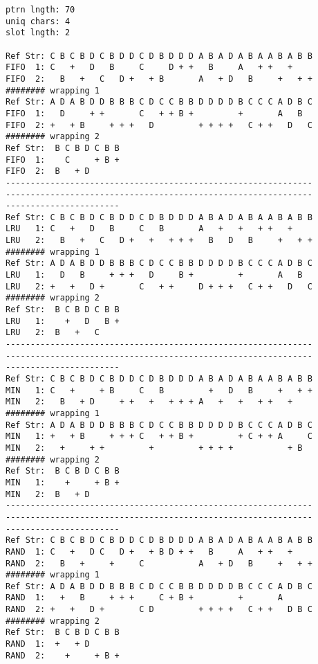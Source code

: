 \documentclass[11pt]{article}
\begin{document}
\begin{lstlisting}
ptrn lngth: 70
uniq chars: 4
slot lngth: 2

Ref Str: C B C B D C B D D C D B D D D A B A D A B A A B A B B
FIFO  1: C   +   D   B     C     D + +   B     A   + +   +
FIFO  2:   B   +   C   D +   + B       A   + D   B     +   + +
######## wrapping 1
Ref Str: A D A B D D B B B C D C C B B D D D D B C C C A D B C
FIFO  1:   D     + +       C   + + B +         +       A   B
FIFO  2: +   + B     + + +   D         + + + +   C + +   D   C
######## wrapping 2
Ref Str:  B C B D C B B
FIFO  1:    C     + B +
FIFO  2:  B   + D
--------------------------------------------------------------
--------------------------------------------------------------
-----------------------
Ref Str: C B C B D C B D D C D B D D D A B A D A B A A B A B B
LRU   1: C   +   D   B     C   B       A   +   +   + +   +
LRU   2:   B   +   C   D +   +   + + +   B   D   B     +   + +
######## wrapping 1
Ref Str: A D A B D D B B B C D C C B B D D D D B C C C A D B C
LRU   1:   D   B     + + +   D     B +         +       A   B
LRU   2: +   +   D +       C   + +     D + + +   C + +   D   C
######## wrapping 2
Ref Str:  B C B D C B B
LRU   1:    +   D   B +
LRU   2:  B   +   C
--------------------------------------------------------------
--------------------------------------------------------------
-----------------------
Ref Str: C B C B D C B D D C D B D D D A B A D A B A A B A B B
MIN   1: C   +     + B     C   B         +   D   B     +   + +
MIN   2:   B   + D     + +   +   + + + A   +   +   + +   +
######## wrapping 1
Ref Str: A D A B D D B B B C D C C B B D D D D B C C C A D B C
MIN   1: +   + B     + + + C   + + B +         + C + + A     C
MIN   2:   +     + +         +         + + + +           + B
######## wrapping 2
Ref Str:  B C B D C B B
MIN   1:    +     + B +
MIN   2:  B   + D
--------------------------------------------------------------
--------------------------------------------------------------
-----------------------
Ref Str: C B C B D C B D D C D B D D D A B A D A B A A B A B B
RAND  1: C   +   D C   D +   + B D + +   B     A   + +   +
RAND  2:   B   +     +     C           A   + D   B     +   + +
######## wrapping 1
Ref Str: A D A B D D B B B C D C C B B D D D D B C C C A D B C
RAND  1:   +   B     + + +     C + B +         +       A
RAND  2: +   +   D +       C D         + + + +   C + +   D B C
######## wrapping 2
Ref Str:  B C B D C B B
RAND  1:  +   + D
RAND  2:    +     + B +

\end{lstlisting}
\end{document}

